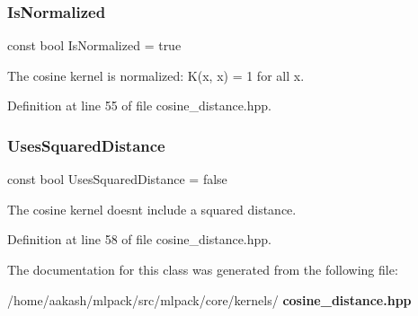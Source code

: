 \subsubsection{Is\+Normalized}
{\footnotesize\ttfamily const bool Is\+Normalized = true\hspace{0.3cm}{\ttfamily [static]}}



The cosine kernel is normalized\+: K(x, x) = 1 for all x. 



Definition at line 55 of file cosine\+\_\+distance.\+hpp.

\mbox{\label{classmlpack_1_1kernel_1_1KernelTraits_3_01CosineDistance_01_4_a12fc177e124e69c8efbac5b08e5c5196}} 
\subsubsection{Uses\+Squared\+Distance}
{\footnotesize\ttfamily const bool Uses\+Squared\+Distance = false\hspace{0.3cm}{\ttfamily [static]}}



The cosine kernel doesn\textquotesingle{}t include a squared distance. 



Definition at line 58 of file cosine\+\_\+distance.\+hpp.



The documentation for this class was generated from the following file\+:\begin{DoxyCompactItemize}
\item 
/home/aakash/mlpack/src/mlpack/core/kernels/\textbf{ cosine\+\_\+distance.\+hpp}\end{DoxyCompactItemize}
